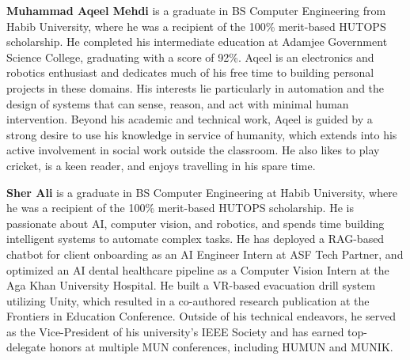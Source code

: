 \textbf{Muhammad Aqeel Mehdi} is a graduate in BS Computer Engineering from Habib University, where he was a recipient of the 100\% merit-based HUTOPS scholarship. He completed his intermediate education at Adamjee Government Science College, graduating with a score of 92\%.
Aqeel is an electronics and robotics enthusiast and dedicates much of his free time to building personal projects in these domains. His interests lie particularly in automation and the design of systems that can sense, reason, and act with minimal human intervention. Beyond his academic and technical work, Aqeel is guided by a strong desire to use his knowledge in service of humanity, which extends into his active involvement in social work outside the classroom. He also likes to play cricket, is a keen reader, and enjoys travelling in his spare time. \newline


\textbf{Sher Ali} is a graduate in BS Computer Engineering at Habib University, where he was a recipient of the 100\% merit-based HUTOPS scholarship.
He is passionate about AI, computer vision, and robotics, and spends time building intelligent systems to automate complex tasks. He has deployed a RAG-based chatbot for client onboarding as an AI Engineer Intern at ASF Tech Partner, and optimized an AI dental healthcare pipeline as a Computer Vision Intern at the Aga Khan University Hospital.
He built a VR-based evacuation drill system utilizing Unity, which resulted in a co-authored research publication at the Frontiers in Education Conference. Outside of his technical endeavors, he served as the Vice-President of his university's IEEE Society and has earned top-delegate honors at multiple MUN conferences, including HUMUN and MUNIK.

